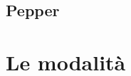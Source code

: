 \textsf{\small }

\subsection{Pepper} %



\textsf{\small }




\section{Le modalità} %


\textsf{\small }



